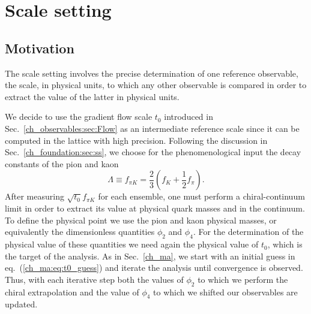 \chapter{Scale setting}%


\label{ch_ss}


\section{Motivation}
\label{ch_ss:sec:introduction}

The scale setting involves the precise determination of one reference observable, the scale, in physical units, to which any other observable is compared in order to extract the value of the latter in physical units. 

We decide to use the gradient flow scale $t_0$ introduced in Sec.~\ref{ch_observables:sec:Flow} as an intermediate reference scale since it can be computed in the lattice with high precision. Following the discussion in Sec.~\ref{ch_foundation:sec:ss}, we choose for the phenomenological input the decay constants of the pion and kaon
\begin{equation}
\label{ch_ss:eq:fpik}
\Lambda\equiv f_{\pi K}=\frac{2}{3}\left(f_K+\frac{1}{2}f_{\pi}\right).
\end{equation}
After measuring $\sqrt{t_0}f_{\pi K}$ for each ensemble, one must perform a chiral-continuum limit in order to extract its value at physical quark masses and in the continuum. To define the physical point we use the pion and kaon physical masses, or equivalently the dimensionless quantities $\phi_2$ and $\phi_4$. For the determination of the physical value of these quantities we need again the physical value of $t_0$, which is the target of the analysis. As in Sec.~\ref{ch_ma}, we start with an initial guess in eq.~(\ref{ch_ma:eq:t0_guess}) and iterate the analysis until convergence is observed. Thus, with each iterative step both the values of $\phi_2$ to which we perform the chiral extrapolation and the value of $\phi_4$ to which we shifted our observables are updated. 

